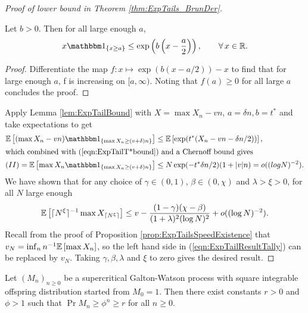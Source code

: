 \begin{proof}[Proof of lower bound in Theorem \ref{thm:ExpTails_BrunDer}]
\begin{lemma} \label{lem:ExpTailBound}
Let $b > 0$. Then for all large enough $a$, 
\begin{equation}
x \Ind_{\{x \geq a\}} \leq \exp\left(b\left(x - \frac{a}{2}\right)\right), \qquad\forall\, x \in \R. 
\end{equation}
\end{lemma}
\begin{proof}
Differentiate the map $f:x \mapsto \exp(b(x - a/2)) - x$ to find that for large enough $a$, f is increasing on $[a, \infty)$. Noting that $f(a) \geq 0$ for all large $a$ concludes the proof.  
\end{proof}
Apply Lemma \ref{lem:ExpTailBound} with $X = \max X_n - vn$, $a = \delta n, b = t^*$ and take expectations to get 
\begin{align*}
\Ex{(\max X_n - vn) \Ind_{\{\max X_n \geq (v + \delta)n\}}} &\leq \Ex{\exp(t^*(X_n - vn - \delta n / 2))}, \nonumber \\
\intertext{which combined with (\ref{eqn:ExpTailT*bound}) and a Chernoff bound gives}
(II) = \Ex{\max X_n \Ind_{\{\max X_n \geq (v + \delta)n\}}} &\leq N \exp(-t^* \delta n /2) (1 + |v|n) = o((log N)^{-2}). 
\end{align*}
We have shown that for any choice of $\gamma \in (0,1)$, $\beta \in (0, \chi)$ and $\lambda > \xi > 0$, for all $N$ large enough
\begin{equation}\label{eqn:ExpTailResultTally}
\mathbb{E}\left[ \lceil N^\xi\rceil^{-1} \max X_{\lceil N^\xi\rceil} \right] \leq v - \frac{(1 - \gamma)(\chi - \beta)}{(1 + \lambda)^2(\log N)^2} + o((\log N)^{-2}). 
\end{equation}
Recall from the proof of Proposition \ref{prop:ExpTailsSpeedExistence} that $v_N = \inf_n n^{-1} \mathbb{E}\left[ \max X_n \right]$, so the left hand side in (\ref{eqn:ExpTailResultTally}) can be replaced by $v_N$. Taking $\gamma, \beta, \lambda$ and $\xi$ to zero gives the desired result. 
\end{proof}

\begin{lemma}\label{lem:ExpTailsGW}
Let $(M_n)_{n \geq 0}$ be a supercritical Galton-Watson process with square integrable offspring distribution started from $M_0 = 1$. Then there exist constants $r > 0$ and $\phi > 1$ such that $\Pr{M_n \geq \phi^n} \geq r$ for all $n \geq 0$. 
\end{lemma}

